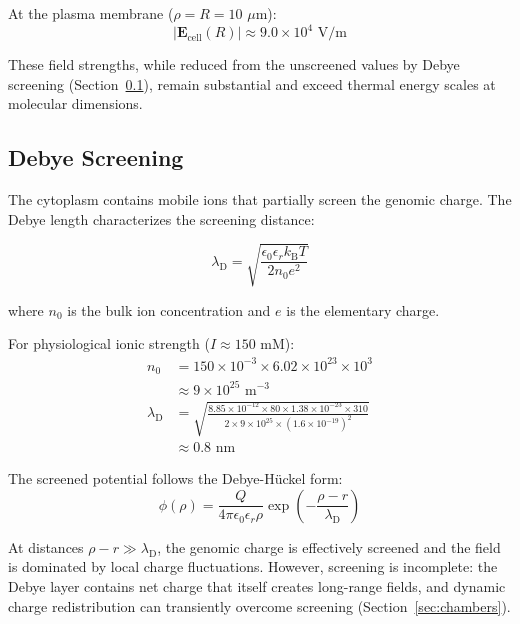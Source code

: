 \documentclass[twocolumn,10pt,aps,prd,superscriptaddress,floatfix,nofootinbib]{revtex4-2}
\theoremstyle{remark}
\newcommand{\kB}{k_{\mathrm{B}}}
\newcommand{\Ecell}{\mathbf{E}_{\mathrm{cell}}}
\newcommand{\lambdaD}{\lambda_{\mathrm{D}}}
\begin{document}
At the plasma membrane ($\rho = R = 10$ $\mu$m):
\begin{equation}
|\Ecell(R)| \approx 9.0 \times 10^{4} \text{ V/m}
\end{equation}

These field strengths, while reduced from the unscreened values by Debye screening (Section~\ref{subsec:screening}), remain substantial and exceed thermal energy scales at molecular dimensions.

\subsection{Debye Screening}
\label{subsec:screening}

The cytoplasm contains mobile ions that partially screen the genomic charge. The Debye length characterizes the screening distance:

\begin{equation}
\lambdaD = \sqrt{\frac{\epsilon_0\epsilon_r \kB T}{2 n_0 e^2}}
\label{eq:debye}
\end{equation}

where $n_0$ is the bulk ion concentration and $e$ is the elementary charge.

For physiological ionic strength ($I \approx 150$ mM):
\begin{align}
n_0 &= 150 \times 10^{-3} \times 6.02 \times 10^{23} \times 10^{3} \nonumber \\
&\approx 9 \times 10^{25} \text{ m}^{-3} \\
\lambdaD &= \sqrt{\frac{8.85 \times 10^{-12} \times 80 \times 1.38 \times 10^{-23} \times 310}{2 \times 9 \times 10^{25} \times (1.6 \times 10^{-19})^2}} \nonumber \\
&\approx 0.8 \text{ nm}
\end{align}

The screened potential follows the Debye-H\"{u}ckel form:
\begin{equation}
\phi(\rho) = \frac{Q}{4\pi\epsilon_0\epsilon_r\rho} \exp\left(-\frac{\rho - r}{\lambdaD}\right)
\label{eq:screened_potential}
\end{equation}

At distances $\rho - r \gg \lambdaD$, the genomic charge is effectively screened and the field is dominated by local charge fluctuations. However, screening is incomplete: the Debye layer contains net charge that itself creates long-range fields, and dynamic charge redistribution can transiently overcome screening (Section~\ref{sec:chambers}).
\end{document}
